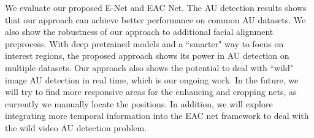 \documentclass[a4paper, 10pt, conference]{ieeeconf}      %
\begin{document}
We evaluate our proposed E-Net and EAC Net. The AU detection results shows that our approach can achieve better performance on common AU datasets. We also show the robustness of our approach to additional facial alignment preprocess. With deep pretrained models and a ``smarter" way to focus on interest regions, the proposed approach shows its power in AU detection on multiple datasets. Our approach also shows the potential to deal with ``wild" image AU detection in real time, which is our ongoing work.
In the future, we will try to find more responsive areas for the enhancing and cropping nets, as currently we manually locate the positions. In addition, we will explore integrating more temporal information into the EAC net framework to deal with the wild video AU detection problem.








\end{document}
